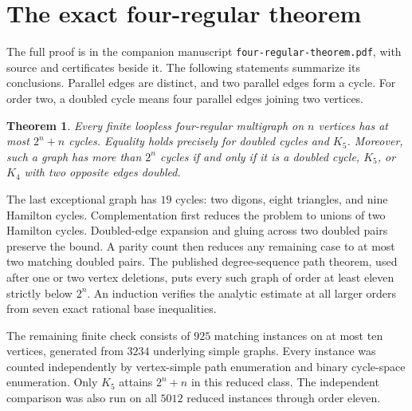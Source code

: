 \documentclass[11pt]{article}
\newtheorem{theorem}{Theorem}[section]
\begin{document}
\tableofcontents























\section{The exact four-regular theorem}

The full proof is in the companion manuscript \nolinkurl{four-regular-theorem.pdf}, with source and certificates beside it.
The following statements summarize its conclusions.
Parallel edges are distinct, and two parallel edges form a cycle.
For order two, a doubled cycle means four parallel edges joining two vertices.

\begin{theorem}
Every finite loopless four-regular multigraph on $n$ vertices has at most $2^n+n$ cycles.
Equality holds precisely for doubled cycles and $K_5$.
Moreover, such a graph has more than $2^n$ cycles if and only if it is a doubled cycle, $K_5$, or $K_4$ with two opposite edges doubled.
\end{theorem}

The last exceptional graph has $19$ cycles: two digons, eight triangles, and nine Hamilton cycles.
Complementation first reduces the problem to unions of two Hamilton cycles.
Doubled-edge expansion and gluing across two doubled pairs preserve the bound.
A parity count then reduces any remaining case to at most two matching doubled pairs.
The published degree-sequence path theorem, used after one or two vertex deletions, puts every such graph of order at least eleven strictly below $2^n$.
An induction verifies the analytic estimate at all larger orders from seven exact rational base inequalities.

The remaining finite check consists of $925$ matching instances on at most ten vertices, generated from $3234$ underlying simple graphs.
Every instance was counted independently by vertex-simple path enumeration and binary cycle-space enumeration.
Only $K_5$ attains $2^n+n$ in this reduced class.
The independent comparison was also run on all $5012$ reduced instances through order eleven.
\end{document}
